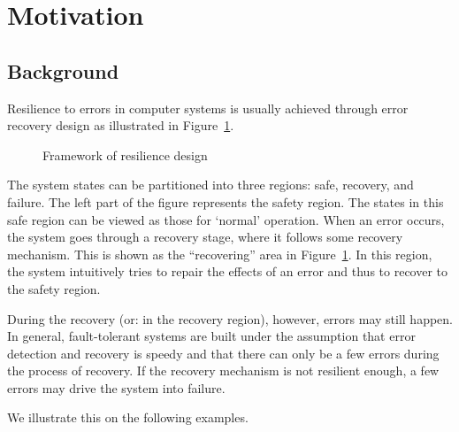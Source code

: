 \section{Motivation}
\subsection{Background}
Resilience to errors in computer systems is usually achieved through error recovery design as illustrated in Figure~\ref{fig.frwk}.  
\begin{figure}[t]
\begin{center}
\caption{Framework of resilience design}
\label{fig.frwk} 
\end{center}
\end{figure}  
The system states can be partitioned into three regions: 
safe, recovery, and failure. 
The left part of the figure represents the safety region.
The states in this safe region can be viewed as those for `normal' operation. 
When an error occurs, the system goes through a recovery stage, where it follows some recovery mechanism.
This is shown as the ``recovering'' area in Figure~\ref{fig.frwk}.
In this region, the system intuitively tries to repair the effects of an error and thus to recover to the safety region. 

During the recovery (or: in the recovery region), however, errors may still happen.  
In general, fault-tolerant systems are built under the assumption that error detection and recovery is speedy and that there 
can only be a few errors\label{reply2.cannnot.be2} 
during the process of recovery.
If the recovery mechanism is not resilient enough, a few errors may drive the system into failure.  

We illustrate this on the following examples.  

